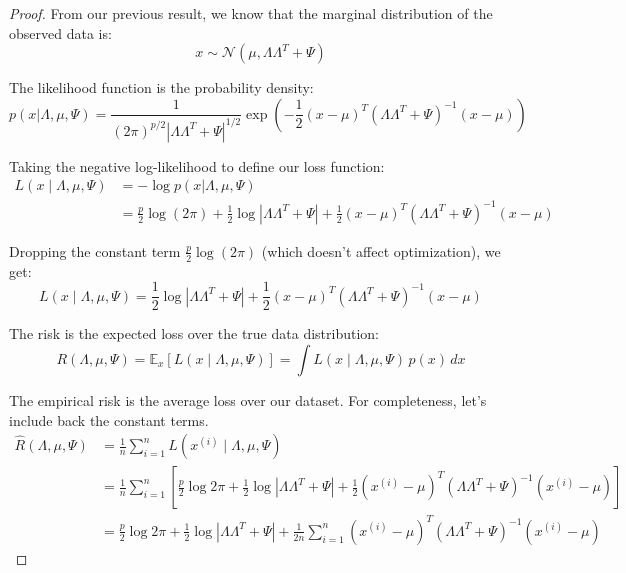   \begin{proof}
    From our previous result, we know that the marginal distribution of the observed data is:
    \begin{equation}
      x \sim \mathcal{N}(\mu, \Lambda \Lambda^T + \Psi)
    \end{equation}
    
    The likelihood function is the probability density:
    \begin{equation}
      p(x | \Lambda, \mu, \Psi) = \frac{1}{(2\pi)^{p/2}|\Lambda \Lambda^T + \Psi|^{1/2}} \exp\left(-\frac{1}{2}(x-\mu)^T(\Lambda \Lambda^T + \Psi)^{-1}(x-\mu)\right)
    \end{equation}
    
    Taking the negative log-likelihood to define our loss function:
    \begin{align}
      L(x \mid \Lambda, \mu, \Psi) &= -\log p(x | \Lambda, \mu, \Psi) \\
      &= \frac{p}{2}\log(2\pi) + \frac{1}{2}\log|\Lambda \Lambda^T + \Psi| + \frac{1}{2}(x-\mu)^T(\Lambda \Lambda^T + \Psi)^{-1}(x-\mu)
    \end{align}
    
    Dropping the constant term $\frac{p}{2}\log(2\pi)$ (which doesn't affect optimization), we get:
    \begin{equation}
      L(x \mid \Lambda, \mu, \Psi) = \frac{1}{2} \log|\Lambda \Lambda^T + \Psi| + \frac{1}{2} (x - \mu)^T (\Lambda \Lambda^T + \Psi)^{-1} (x - \mu)
    \end{equation}
    
    The risk is the expected loss over the true data distribution:
    \begin{equation}
      R(\Lambda, \mu, \Psi) = \mathbb{E}_x [L(x \mid \Lambda, \mu, \Psi)] = \int L(x \mid \Lambda, \mu, \Psi) \, p(x) \,dx
    \end{equation}
    
    The empirical risk is the average loss over our dataset. For completeness, let's include back the constant terms. 
    \begin{align}
      \hat{R}(\Lambda, \mu, \Psi) &= \frac{1}{n} \sum_{i=1}^n L(x^{(i)} \mid \Lambda, \mu, \Psi) \\
      &= \frac{1}{n} \sum_{i=1}^n \left[ \frac{p}{2} \log{2 \pi} + \frac{1}{2} \log|\Lambda \Lambda^T + \Psi| + \frac{1}{2} (x^{(i)} - \mu)^T (\Lambda \Lambda^T + \Psi)^{-1} (x^{(i)} - \mu) \right] \\
      &= \frac{p}{2} \log{2 \pi} + \frac{1}{2} \log|\Lambda \Lambda^T + \Psi| + \frac{1}{2n} \sum_{i=1}^n (x^{(i)} - \mu)^T (\Lambda \Lambda^T + \Psi)^{-1} (x^{(i)} - \mu)
    \end{align}


\end{proof}
